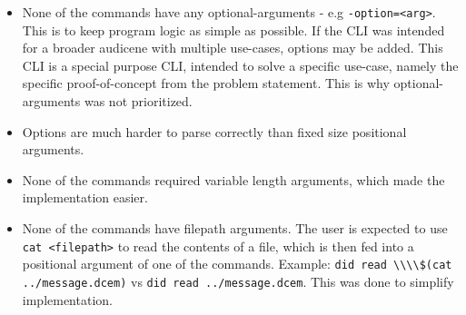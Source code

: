 \begin{itemize}
\tightlist
\item
  None of the commands have any optional-arguments - e.g
  \lstinline!-option=<arg>!. This is to keep program logic
  as simple as possible. If the CLI was intended for a broader audicene
  with multiple use-cases, options may be added. This CLI is a special
  purpose CLI, intended to solve a specific use-case, namely the
  specific proof-of-concept from the problem statement. This is why
  optional-arguments was not prioritized.
\item
  Options are much harder to parse correctly than fixed size positional
  arguments.
\item
  None of the commands required variable length arguments, which made
  the implementation easier.
\item
  None of the commands have filepath arguments. The user is expected to
  use \lstinline!cat <filepath>! to read the contents of a
  file, which is then fed into a positional argument of one of the
  commands. Example:
  \lstinline!did read \\\\$(cat ../message.dcem)! vs
  \lstinline!did read ../message.dcem!. This was done to
  simplify implementation.
\end{itemize}
